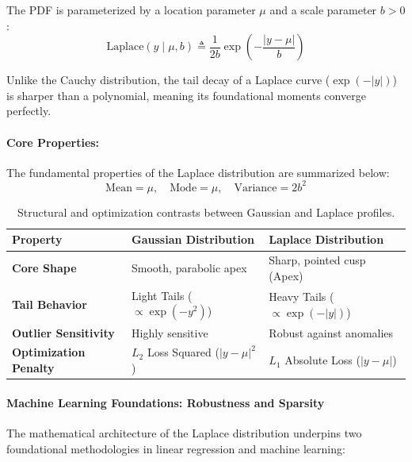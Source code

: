 \documentclass{article}
\begin{document}
The PDF is parameterized by a location parameter $\mu$ and a scale parameter $b > 0$:
\begin{equation}
\text{Laplace}(y \mid \mu, b) \triangleq \frac{1}{2b} \exp \left( -\frac{|y - \mu|}{b} \right) \tag{196}
\end{equation}

Unlike the Cauchy distribution, the tail decay of a Laplace curve ($\exp(-|y|)$) is sharper than a polynomial, meaning its foundational moments converge perfectly.

\paragraph{Core Properties:}
The fundamental properties of the Laplace distribution are summarized below:
\begin{equation}
\text{Mean} = \mu, \quad \text{Mode} = \mu, \quad \text{Variance} = 2b^2 \tag{197}
\end{equation}

\begin{table}[H]
\centering
\small
\renewcommand{\arraystretch}{1.5}
\begin{tabular}{lll}
\hline
\textbf{Property} & \textbf{Gaussian Distribution} & \textbf{Laplace Distribution} \\ \hline
\textbf{Core Shape} & Smooth, parabolic apex & Sharp, pointed cusp (Apex) \\
\textbf{Tail Behavior} & Light Tails ($\propto \exp(-y^2)$) & Heavy Tails ($\propto \exp(-|y|)$) \\
\textbf{Outlier Sensitivity} & Highly sensitive & Robust against anomalies \\
\textbf{Optimization Penalty} & $L_2$ Loss Squared ($|y-\mu|^2$) & $L_1$ Absolute Loss ($|y-\mu|$) \\ \hline
\end{tabular}
\caption{Structural and optimization contrasts between Gaussian and Laplace profiles.}
\label{tab:laplace_vs_gaussian}
\end{table}

\paragraph{Machine Learning Foundations: Robustness and Sparsity}
The mathematical architecture of the Laplace distribution underpins two foundational methodologies in linear regression and machine learning:
\end{document}

